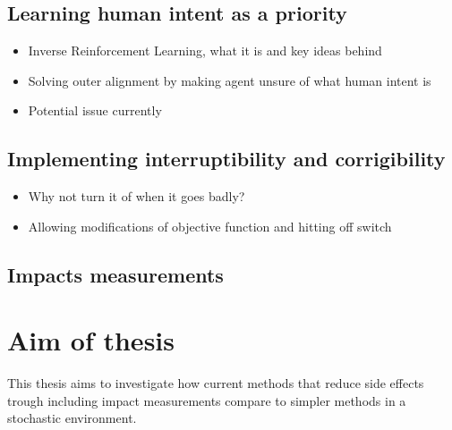 \documentclass[12pt,A4]{report}
\theoremstyle{definition}
\begin{document}
\subsection{Learning human intent as a priority}
\begin{itemize}
    \item Inverse Reinforcement Learning, what it is and key ideas behind
    \item Solving outer alignment by making agent unsure of what human intent is
    \item Potential issue currently

\end{itemize}

\subsection{Implementing interruptibility and corrigibility}
\begin{itemize}
    \item Why not turn it of when it goes badly?
    \item Allowing modifications of objective function and hitting off switch
\end{itemize}

\subsection{Impacts measurements}


\section{Aim of thesis}
This thesis aims to investigate how current methods that reduce side effects trough including impact measurements compare to simpler methods in a stochastic environment.
\end{document}
